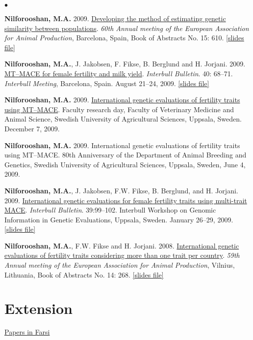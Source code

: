 \documentclass[margin,line]{res}
\newenvironment{list2}{
  \begin{list}{$\bullet$}{%
      \setlength{\itemsep}{0in}
      \setlength{\parsep}{0in} \setlength{\parskip}{0in}
      \setlength{\topsep}{0in} \setlength{\partopsep}{0in}
      \setlength{\leftmargin}{0.2in}}}{\end{list}}
\begin{document}
\begin{resume}
\begin{list2}
\item {\bf Nilforooshan, M.A.} 2009. \href{https://drive.google.com/file/d/0B2l_izQwJmVpYW04amtSMGdjUmM/view?usp=sharing}{Developing the method of estimating genetic similarity between populations}. {\em 60th Annual meeting of the European Association for Animal Production}, Barcelona, Spain, Book of Abstracts No. 15: 610. \href{http://old.eaap.org/Previous_Annual_Meetings/2009Barcelona/Papers/53_Nilforooshan.pdf}{[slides file]}
\item {\bf Nilforooshan, M.A.}, J. Jakobsen, F. Fikse, B. Berglund and H. Jorjani. 2009. \href{https://journal.interbull.org/index.php/ib/article/view/1087}{MT–MACE for female fertility and milk yield}. {\em Interbull Bulletin}. 40: 68--71. {\em Interbull Meeting}, Barcelona, Spain. August 21--24, 2009. \href{https://drive.google.com/file/d/0B2l_izQwJmVpRTlrOGE3OWluVnc/view?usp=sharing}{[slides file]}
\item {\bf Nilforooshan, M.A.} 2009. \href{https://drive.google.com/file/d/0B2l_izQwJmVpUC1TVkx2MVc1ZUE/view?usp=sharing}{International genetic evaluations of fertility traits using MT–MACE}. Faculty research day, Faculty of Veterinary Medicine and Animal Science, Swedish University of Agricultural Sciences, Uppsala, Sweden. December 7, 2009.
\item {\bf Nilforooshan, M.A.} 2009. International genetic evaluations of fertility traits using MT–MACE. 80th Anniversary of the Department of Animal Breeding and Genetics, Swedish University of Agricultural Sciences, Uppsala, Sweden, June 4, 2009.
\item {\bf Nilforooshan, M.A.}, J. Jakobsen, F.W. Fikse, B. Berglund, and H. Jorjani. 2009. \href{https://journal.interbull.org/index.php/ib/article/view/1073}{International genetic evaluations for female fertility traits using multi-trait MACE}. {\em Interbull Bulletin}. 39:99--102. Interbull Workshop on Genomic Information in Genetic Evaluations, Uppsala, Sweden. January 26--29, 2009. \href{https://drive.google.com/file/d/0B2l_izQwJmVpZG1sZlg2cF9zRWc/view?usp=sharing}{[slides file]}
\item {\bf Nilforooshan, M.A.}, F.W. Fikse and H. Jorjani. 2008. \href{https://drive.google.com/file/d/0B2l_izQwJmVpQWdZaTFwTUNXOFk/view?usp=sharing}{International genetic evaluations of fertility traits considering more than one trait per country}. {\em 59th Annual meeting of the European Association for Animal Production}, Vilnius, Lithuania, Book of Abstracts No. 14: 268. \href{http://old.eaap.org/Previous_Annual_Meetings/2008Vilnius/Papers/published/35_Nilforooshan.pdf}{[slides file]}
\end{list2}
\section{\sc Extension}

\href{https://nilforooshan.github.io/resume/extension}{Papers in Farsi}

\end{resume}
\end{document}
